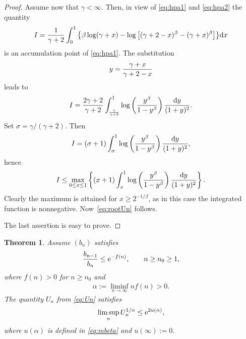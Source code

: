 \documentclass[pdftex]{sigma}
\numberwithin{equation}{section}
\newtheorem{thm}{Theorem}[section]
\begin{document}
\begin{proof}
Assume now that $\gamma<\infty$. Then, in view of \eqref{eq:hpa1} and \eqref{eq:hpa2} the quantity
\begin{gather*}
I={1\over \gamma+2} \int_0^1 \big\{\beta\log (\gamma+x) -\log \big[(\gamma+2-x)^\beta-(\gamma+x)^\beta\big]\big\}{\rm d}x
\end{gather*}
is an accumulation point of \eqref{eq:hpa1}. The substitution
\begin{gather*}
 y={\gamma+x\over \gamma+2-x}
\end{gather*}
 leads to
\begin{gather*}
I ={2\gamma+2\over \gamma+2}\int_{\gamma\over \gamma+2}^1\log \left({y^\beta\over 1-y^\beta}\right) {{\rm d}y\over (1+y)^2}.
\end{gather*}
Set $\sigma=\gamma /(\gamma+2)$. Then
\begin{gather*}
I =(\sigma+1)\int_\sigma^1\log \left({y^\beta\over 1-y^\beta}\right) {{\rm d}y\over (1+y)^2},
\end{gather*}
hence
\begin{gather*}
I \le \max_{0\le x\le 1} \left \{(x+1)\int_x^1\log \left({y^\beta\over 1-y^\beta}\right) {{\rm d}y\over (1+y)^2}\right \}.
\end{gather*}
Clearly the maximum is attained for $x\ge 2^{-1/\beta}$, as in this case the integrated function is nonnegative. Now~\eqref{eq:rootUn} follows.

The last assertion is easy to prove.
\end{proof}

\begin{thm}\label{thm:thm2a} Assume $(b_n)$ satisfies
\begin{gather}\label{eq:hpb1}
\frac{b_{n-1}}{b_n}\le {\rm e}^{-f(n)},\qquad n\ge n_0\ge 1,
\end{gather}
where $f(n)>0$ for $n\ge n_0$ and
\begin{gather*}
\alpha:=\liminf_{n\to\infty} nf(n)>0.
\end{gather*}
The quantity $U_n$ from \eqref{eq:Un} satisfies
\begin{gather}\label{eq:rootUn1}
\limsup_n U_n^{1/n}\le {\rm e}^{2u(\alpha)},
\end{gather}
where $u(\alpha)$ is defined in \eqref{eq:mbeta} and $u(\infty):=0$.
\end{thm}
\end{document}
